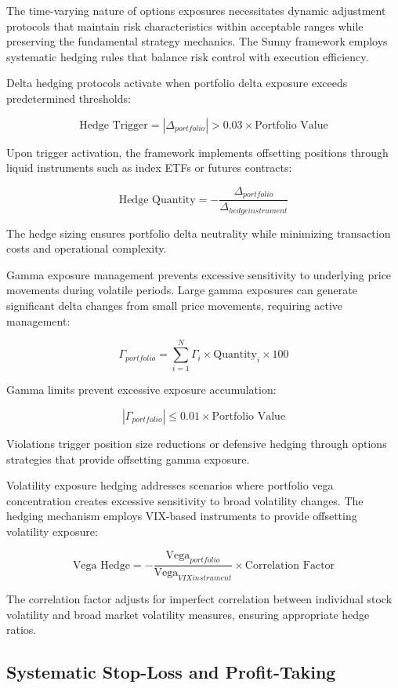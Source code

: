 \documentclass[
  american,
  11pt,
  11pt,
  letterpaper,
  onecolumn]{article}
\begin{document}
The time-varying nature of options exposures necessitates dynamic
adjustment protocols that maintain risk characteristics within
acceptable ranges while preserving the fundamental strategy mechanics.
The Sunny framework employs systematic hedging rules that balance risk
control with execution efficiency.

Delta hedging protocols activate when portfolio delta exposure exceeds
predetermined thresholds:

\[\text{Hedge Trigger} = |\Delta_{portfolio}| > 0.03 \times \text{Portfolio Value}\]

Upon trigger activation, the framework implements offsetting positions
through liquid instruments such as index ETFs or futures contracts:

\[\text{Hedge Quantity} = -\frac{\Delta_{portfolio}}{\Delta_{hedge instrument}}\]

The hedge sizing ensures portfolio delta neutrality while minimizing
transaction costs and operational complexity.

Gamma exposure management prevents excessive sensitivity to underlying
price movements during volatile periods. Large gamma exposures can
generate significant delta changes from small price movements, requiring
active management:

\[\Gamma_{portfolio} = \sum_{i=1}^{N} \Gamma_i \times \text{Quantity}_i \times 100\]

Gamma limits prevent excessive exposure accumulation:

\[|\Gamma_{portfolio}| \leq 0.01 \times \text{Portfolio Value}\]

Violations trigger position size reductions or defensive hedging through
options strategies that provide offsetting gamma exposure.

Volatility exposure hedging addresses scenarios where portfolio vega
concentration creates excessive sensitivity to broad volatility changes.
The hedging mechanism employs VIX-based instruments to provide
offsetting volatility exposure:

\[\text{Vega Hedge} = -\frac{\text{Vega}_{portfolio}}{\text{Vega}_{VIX instrument}} \times \text{Correlation Factor}\]

The correlation factor adjusts for imperfect correlation between
individual stock volatility and broad market volatility measures,
ensuring appropriate hedge ratios.

\subsection{Systematic Stop-Loss and
Profit-Taking}\label{systematic-stop-loss-and-profit-taking}
\end{document}
